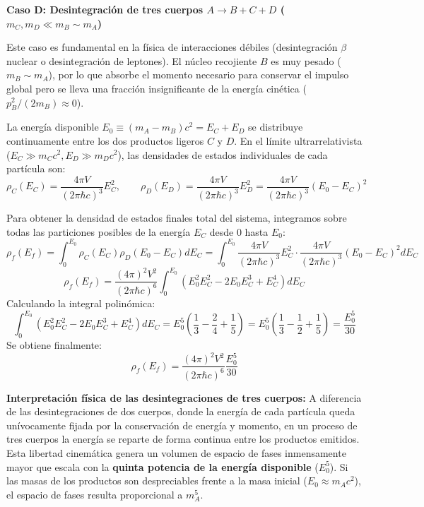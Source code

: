 \textbf{Caso D: Desintegración de tres cuerpos $A \to B + C + D$ ($m_C, m_D \ll m_B \sim m_A$)}

Este caso es fundamental en la física de interacciones débiles (desintegración $\beta$ nuclear o desintegración de leptones). El núcleo recojiente $B$ es muy pesado ($m_B \sim m_A$), por lo que absorbe el momento necesario para conservar el impulso global pero se lleva una fracción insignificante de la energía cinética ($p_B^2 / (2m_B) \approx 0$).

La energía disponible $E_0 \equiv (m_A - m_B)c^2 = E_C + E_D$ se distribuye continuamente entre los dos productos ligeros $C$ y $D$.
En el límite ultrarrelativista ($E_C \gg m_C c^2, E_D \gg m_D c^2$), las densidades de estados individuales de cada partícula son:
\begin{equation}
\rho_C(E_C) = \frac{4\pi V}{(2\pi\hbar c)^3} E_C^2, \qquad \rho_D(E_D) = \frac{4\pi V}{(2\pi\hbar c)^3} E_D^2 = \frac{4\pi V}{(2\pi\hbar c)^3} (E_0 - E_C)^2
\end{equation}

Para obtener la densidad de estados finales total del sistema, integramos sobre todas las particiones posibles de la energía $E_C$ desde $0$ hasta $E_0$:
\begin{equation}
\rho_f(E_f) = \int_0^{E_0} \rho_C(E_C) \rho_D(E_0 - E_C) dE_C = \int_0^{E_0} \frac{4\pi V}{(2\pi\hbar c)^3} E_C^2 \cdot \frac{4\pi V}{(2\pi\hbar c)^3} (E_0 - E_C)^2 dE_C
\end{equation}
\begin{equation}
\rho_f(E_f) = \frac{(4\pi)^2 V^2}{(2\pi\hbar c)^6} \int_0^{E_0} \left( E_0^2 E_C^2 - 2 E_0 E_C^3 + E_C^4 \right) dE_C
\end{equation}
Calculando la integral polinómica:
\begin{equation}
\int_0^{E_0} \left( E_0^2 E_C^2 - 2 E_0 E_C^3 + E_C^4 \right) dE_C = E_0^5 \left( \frac{1}{3} - \frac{2}{4} + \frac{1}{5} \right) = E_0^5 \left( \frac{1}{3} - \frac{1}{2} + \frac{1}{5} \right) = \frac{E_0^5}{30}
\end{equation}
Se obtiene finalmente:
\begin{equation}
\rho_f(E_f) = \frac{(4\pi)^2 V^2}{(2\pi\hbar c)^6} \frac{E_0^5}{30}
\end{equation}

\textbf{Interpretación física de las desintegraciones de tres cuerpos:}
A diferencia de las desintegraciones de dos cuerpos, donde la energía de cada partícula queda unívocamente fijada por la conservación de energía y momento, en un proceso de tres cuerpos la energía se reparte de forma continua entre los productos emitidos. Esta libertad cinemática genera un volumen de espacio de fases inmensamente mayor que escala con la \textbf{quinta potencia de la energía disponible} ($E_0^5$). Si las masas de los productos son despreciables frente a la masa inicial ($E_0 \approx m_A c^2$), el espacio de fases resulta proporcional a $m_A^5$.


